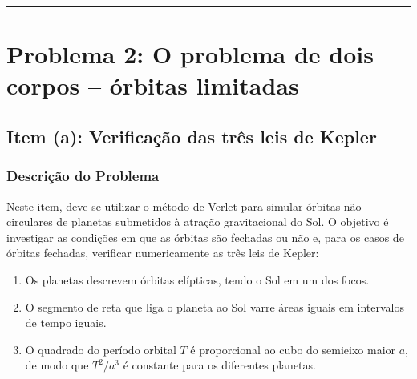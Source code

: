 \documentclass[12pt,a4paper]{article}
\begin{document}
\vspace{0.5cm}
\hrule
\vspace{0.5cm}

\section{Problema 2: O problema de dois corpos -- órbitas limitadas}

\subsection{Item (a): Verificação das três leis de Kepler}

\subsubsection{Descrição do Problema}

Neste item, deve-se utilizar o método de Verlet para simular órbitas não circulares de planetas submetidos à atração gravitacional do Sol. O objetivo é investigar as condições em que as órbitas são fechadas ou não e, para os casos de órbitas fechadas, verificar numericamente as três leis de Kepler:

\begin{enumerate}
    \item Os planetas descrevem órbitas elípticas, tendo o Sol em um dos focos.
    \item O segmento de reta que liga o planeta ao Sol varre áreas iguais em intervalos de tempo iguais.
    \item O quadrado do período orbital $T$ é proporcional ao cubo do semieixo maior $a$, de modo que $T^2/a^3$ é constante para os diferentes planetas.
\end{enumerate}

\end{document}
